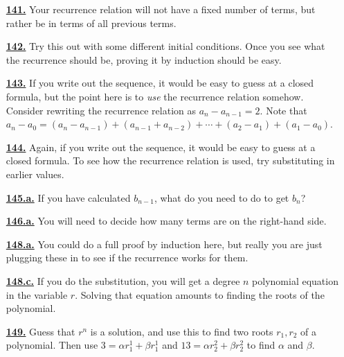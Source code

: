 \documentclass[10pt,]{book}
\theoremstyle{plain}
\theoremstyle{definition}
\theoremstyle{definition}
\theoremstyle{definition}
\numberwithin{equation}{chapter}
\begin{document}
\begin{itemize}[itemsep=1em]
\hypertarget{a-141}{}\item[\textbf{\hyperref[act-catalanfirst]{141.}}]
\hypertarget{p-918}{}%
Your recurrence relation will not have a fixed number of terms, but rather be in terms of all previous terms.%

\hypertarget{a-142}{}\item[\textbf{\hyperref[activity-135]{142.}}]
\hypertarget{p-922}{}%
Try this out with some different initial conditions.  Once you see what the recurrence should be, proving it by induction should be easy.%

\hypertarget{a-143}{}\item[\textbf{\hyperref[act-arithmetic]{143.}}]
\hypertarget{p-926}{}%
If you write out the sequence, it would be easy to guess at a closed formula, but the point here is to \emph{use} the recurrence relation somehow.  Consider rewriting the recurrence relation as \(a_n - a_{n-1} = 2\).  Note that \(a_n - a_0 = (a_n - a_{n-1}) + (a_{n-1} + a_{n-2}) + \cdots + (a_2 - a_1) + (a_1 - a_0)\).%

\hypertarget{a-144}{}\item[\textbf{\hyperref[act-geometric]{144.}}]
\hypertarget{p-928}{}%
Again, if you write out the sequence, it would be easy to guess at a closed formula.  To see how the recurrence relation is used, try substituting in earlier values.%

\hypertarget{a-145.a}{}\item[\textbf{\hyperref[task-175]{145.a.}}]
\hypertarget{p-934}{}%
If you have calculated \(b_{n-1}\), what do you need to do to get \(b_n\)?%

\hypertarget{a-146.a}{}\item[\textbf{\hyperref[task-179]{146.a.}}]
\hypertarget{p-942}{}%
You will need to decide how many terms are on the right-hand side.%

\hypertarget{a-148.a}{}\item[\textbf{\hyperref[task-182]{148.a.}}]
\hypertarget{p-951}{}%
You could do a full proof by induction here, but really you are just plugging these in to see if the recurrence works for them.%

\hypertarget{a-148.c}{}\item[\textbf{\hyperref[task-184]{148.c.}}]
\hypertarget{p-954}{}%
If you do the substitution, you will get a degree \(n\) polynomial equation in the variable \(r\).  Solving that equation amounts to finding the roots of the polynomial.%

\hypertarget{a-149}{}\item[\textbf{\hyperref[activity-142]{149.}}]
\hypertarget{p-957}{}%
Guess that \(r^n\) is a solution, and use this to find two roots \(r_1, r_2\) of a polynomial.  Then use \(3 = \alpha r_1^1 + \beta r_1^1\) and \(13 = \alpha r_2^2 + \beta r_2^2\) to find \(\alpha\) and \(\beta\).%


\end{itemize}
\end{document}
